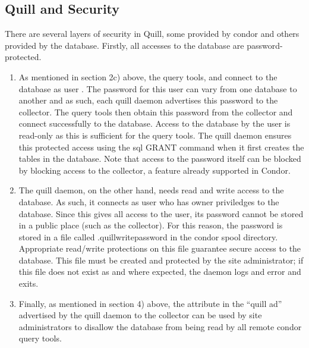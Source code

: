 \subsection{\label{sec:Quill-Security}Quill and Security}

There are several layers of security in Quill, some provided by condor and
others provided by the database.  Firstly, all accesses to the database
are password-protected.

\begin{enumerate}
\item As mentioned in section 2c) above, the query tools,  and
 connect to the database as user .
The password for this user can vary from one database to another and
as such, each quill daemon advertises this password to the collector.
The query tools then obtain this password from the collector and
connect successfully to the database.  Access to the database by the
 user is read-only as this is sufficient for the
query tools.  The quill daemon ensures this protected access using the sql
GRANT command when it first creates the tables in the database.  Note that
access to the  password itself can be blocked by
blocking access to the collector, a feature already supported in Condor.

\item The quill daemon, on the other hand, needs read and write access
to the database.  As such, it connects as user 
who has owner priviledges to the database.  Since this gives all
access to the  user, its password cannot
be stored in a public place (such as the collector).  For this
reason, the  password is stored in a file called
.quillwritepassword in the condor spool directory.  Appropriate read/write
protections on this file guarantee secure access to the database.
This file must be created and protected by the site administrator;
if this file does not exist as and where expected, the 
daemon logs and error and exits.

\item Finally, as mentioned in section 4) above, the
 attribute in the ``quill ad'' advertised
by the quill daemon to the collector can be used by site administrators
to disallow the database from being read by all remote condor query tools.

\end{enumerate}

